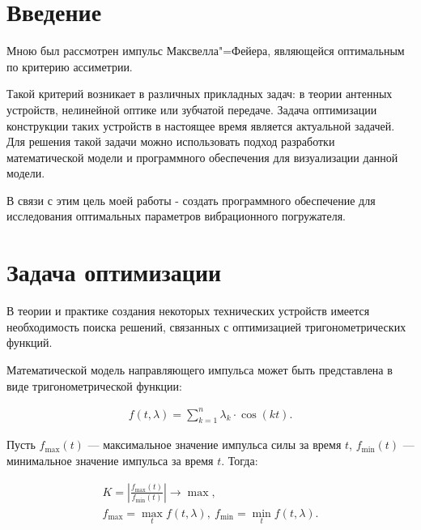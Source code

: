 \section*{Введение}

Мною был рассмотрен импульс Максвелла"=Фейера, являющейся оптимальным по критерию ассиметрии.

Такой критерий возникает в различных прикладных задач: в теории антенных устройств, нелинейной оптике или зубчатой передаче.
Задача оптимизации конструкции таких устройств в настоящее время является актуальной задачей.
Для решения такой задачи можно использовать подход разработки математической модели и программного обеспечения для визуализации данной модели.

В связи с этим цель моей работы - создать программного обеспечение для исследования оптимальных параметров вибрационного погружателя.

\clearpage
\section{Задача оптимизации}

В теории и практике создания некоторых технических устройств имеется необходимость поиска решений, связанных с оптимизацией тригонометрических функций.

Математической модель направляющего импульса может быть представлена в виде тригонометрической функции:

\begin{equation}\label{eq:harmonic_sum}
    \begin{gathered}
        f(t, \lambda) = \sum\limits_{k = 1}^n \lambda_k \cdot \cos(kt).
    \end{gathered}
\end{equation}

Пусть $f_{\max}(t)$ --- максимальное значение импульса силы за время $t$, $f_{\min}(t)$ --- минимальное значение импульса за время $t$. Тогда:

\begin{equation}\label{eq:optim}
    \begin{gathered}
        K = \left| \frac{f_{\max}(t)}{f_{\min}(t)} \right| \rightarrow \max, \\
        f_{\max} = \max_t f(t, \lambda), \ f_{\min} = \min_t f(t, \lambda).
    \end{gathered}
\end{equation}


